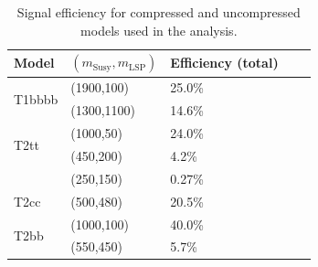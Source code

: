 \begin{table}[h!]
    \caption{Signal efficiency for compressed and uncompressed models used in
        the analysis.}
    \label{tab:sig-eff}
    \centering
    \begin{tabular}{ lllll }
        \hline \hline
        Model & $(m_{\mathrm{Susy}},m_{\mathrm{LSP}})$ & Efficiency (total) \\ 
        \hline
        \multirow{2}{*}{T1bbbb}
            & (1900,100)  & 25.0\% \\
            & (1300,1100) & 14.6\% \\
        \hline
        \multirow{2}{*}{T2tt}
            & (1000,50) & 24.0\% \\
            & (450,200) & 4.2\% \\
            & (250,150) & 0.27\% \\
        \hline
        T2cc
            & (500,480) & 20.5\% \\
        \hline
        \multirow{2}{*}{T2bb}
            & (1000,100) & 40.0\% \\
            & (550,450)  & 5.7\% \\
        \hline \hline
    \end{tabular}
\end{table}

